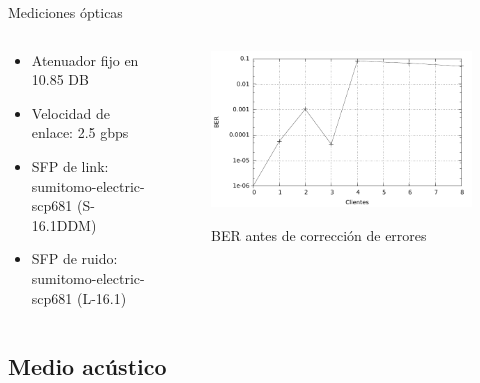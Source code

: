 \documentclass[aspectratio=169]{beamer}
\begin{document}
\begin{frame}{Mediciones ópticas}


\begin{columns}
  \begin{column}{0.40\textwidth}

\begin{itemize}
\item Atenuador fijo en 10.85 DB
\item Velocidad de enlace: 2.5 gbps
\item SFP de link: sumitomo-electric-scp681 (S-16.1DDM)
\item SFP de ruido: sumitomo-electric-scp681 (L-16.1)
 \end{itemize}

  \end{column}
  \begin{column}{0.70\textwidth}

\begin{figure}[!t]
   \includegraphics[width=0.90 \textwidth]{graphs/medicion-optica-ber-sumitomo}
   \qquad
   
  \vspace{0.2cm}
  BER antes de corrección de errores
\end{figure}

  \end{column}
\end{columns}



\end{frame}

\subsection{Medio acústico}
\end{document}
